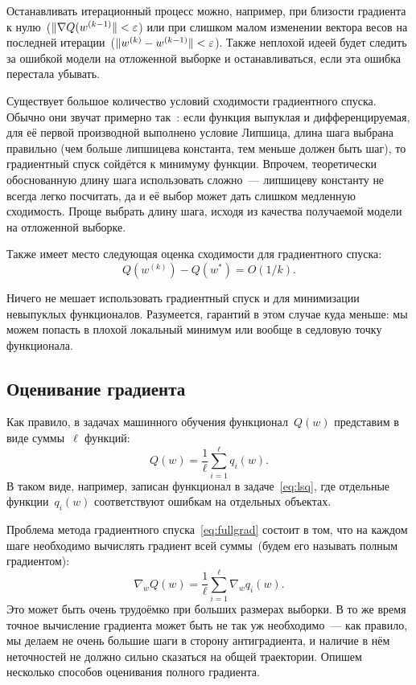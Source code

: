 \documentclass[12pt,fleqn]{article}
\begin{document}
Останавливать итерационный процесс можно, например, при близости градиента к нулю~($\|\nabla Q(w^{(k-1)}\| < \varepsilon$)
или при слишком малом изменении вектора весов на последней итерации~($\|w^{(k)} - w^{(k-1)}\| < \varepsilon$).
Также неплохой идеей будет следить за ошибкой модели на отложенной выборке и останавливаться,
если эта ошибка перестала убывать.

Существует большое количество условий сходимости градиентного спуска.
Обычно они звучат примерно так~\cite{nesterov04lectures}: если функция выпуклая и дифференцируемая,
для её первой производной выполнено условие Липшица,
длина шага выбрана правильно (чем больше липшицева константа, тем меньше должен быть шаг),
то градиентный спуск сойдётся к минимуму функции.
Впрочем, теоретически обоснованную длину шага использовать сложно~--- липшицеву константу не всегда легко посчитать,
да и её выбор может дать слишком медленную сходимость.
Проще выбрать длину шага, исходя из качества получаемой модели на отложенной выборке.

Также имеет место следующая оценка сходимости для градиентного спуска:
\[
    Q(w^{(k)}) - Q(w^*)
    =
    O(1 / k).
\]

Ничего не мешает использовать градиентный спуск и для минимизации невыпуклых функционалов.
Разумеется, гарантий в этом случае куда меньше: мы можем попасть в плохой локальный минимум или
вообще в седловую точку функционала.

\subsection{Оценивание градиента}

Как правило, в задачах машинного обучения функционал~$Q(w)$ представим в виде суммы~$\ell$ функций:
\[
    Q(w)
    =
    \frac{1}{\ell}
    \sum_{i = 1}^{\ell}
        q_i(w).
\]
В таком виде, например, записан функционал в задаче~\eqref{eq:lsq},
где отдельные функции~$q_i(w)$ соответствуют ошибкам на отдельных объектах.

Проблема метода градиентного спуска~\eqref{eq:fullgrad} состоит в том,
что на каждом шаге необходимо вычислять градиент всей суммы~(будем его называть полным градиентом):
\[
    \nabla_w Q(w)
    =
    \frac{1}{\ell}
    \sum_{i = 1}^{\ell}
        \nabla_w q_i(w).
\]
Это может быть очень трудоёмко при больших размерах выборки.
В то же время точное вычисление градиента может быть не так уж необходимо~---
как правило, мы делаем не очень большие шаги в сторону антиградиента,
и наличие в нём неточностей не должно сильно сказаться на общей траектории.
Опишем несколько способов оценивания полного градиента.
\end{document}
